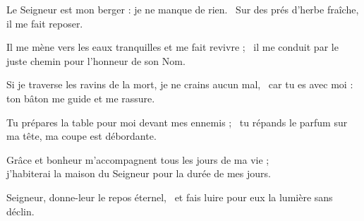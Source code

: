 \item Le Seigneur est mon berger : je ne manque de rien.~\psstar{} Sur des prés d'herbe fraîche, il me fait reposer.

\item Il me mène vers les eaux tranquilles et me fait revivre ;~\psstar{} il me conduit par le juste chemin pour l'honneur de son Nom.

\item Si je traverse les ravins de la mort, je ne crains aucun mal,~\psstar{} car tu es avec moi : ton bâton me guide et me rassure.

\item Tu prépares la table pour moi devant mes ennemis ;~\psstar{} tu répands le parfum sur ma tête, ma coupe est débordante.

\item Grâce et bonheur m'accompagnent tous les jours de ma vie ;~\psstar{} \\j'habiterai la maison du Seigneur pour la durée de mes jours.

\item Seigneur, donne-leur le repos éternel,~\psstar{} et fais luire pour eux la lumière sans déclin.